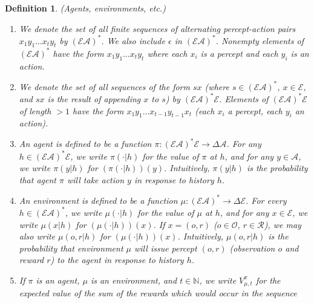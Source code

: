 \documentclass[twoside]{article}
\newtheorem{definition}[theorem]{Definition}
\begin{document}
\begin{definition}
\label{omnibusdefn}
    (Agents, environments, etc.)
    \begin{enumerate}
        \item
        We denote the set of all finite sequences
        of alternating percept-action pairs $x_1y_1\ldots x_ty_t$
        by $(\mathcal E\mathcal A)^*$.
        We also include $\epsilon$ in $(\mathcal E\mathcal A)^*$.
        Nonempty elements of $(\mathcal E\mathcal A)^*$ have the
        form $x_1y_1\ldots x_ty_t$ where each $x_i$ is a percept and
        each $y_i$ is an action.
        \item
        We denote the set of all sequences of the form $sx$ (where
        $s\in (\mathcal E\mathcal A)^*$, $x\in\mathcal E$, and $sx$
        is the result of appending $x$ to $s$) by
        $(\mathcal E\mathcal A)^*\mathcal E$.
        Elements of $(\mathcal E\mathcal A)^* \mathcal E$
        of length $>1$ have the form
        $x_1y_1\ldots x_{t-1}y_{t-1}x_t$
        (each $x_i$ a percept, each $y_i$ an action).
        \item
        An \emph{agent} is defined to be a function
        $\pi:(\mathcal E\mathcal A)^*\mathcal E\to \Delta \mathcal A$.
        For any $h\in (\mathcal E\mathcal A)^*\mathcal E$,
        we write $\pi(\cdot|h)$ for the value of $\pi$ at $h$, and
        for any $y\in \mathcal A$, we write $\pi(y|h)$ for
        $(\pi(\cdot|h))(y)$.
        Intuitively, $\pi(y|h)$ is the probability that agent $\pi$
        will take action $y$ in response to history $h$.
        \item
        An \emph{environment} is defined to be a function
        $\mu:(\mathcal E\mathcal A)^*\to\Delta\mathcal E$.
        For every $h\in(\mathcal E\mathcal A)^*$, we write
        $\mu(\cdot|h)$ for the value of $\mu$ at $h$, and for any
        $x\in\mathcal E$, we write $\mu(x|h)$ for $(\mu(\cdot|h))(x)$.
        If $x=(o,r)$ ($o\in\mathcal O$, $r\in\mathcal R$), we may also
        write $\mu(o,r|h)$ for $(\mu(\cdot|h))(x)$.
        Intuitively, $\mu(o,r|h)$ is the probability that environment
        $\mu$ will issue percept $(o,r)$ (observation $o$ and reward $r$)
        to the agent in response to history $h$.
        \item
        If $\pi$ is an agent, $\mu$ is an environment, and $t\in\mathbb N$,
        we write $V^\pi_{\mu,t}$ for the expected value of the sum of
        the rewards which would occur in the sequence

\end{enumerate}
\end{definition}
\end{document}
